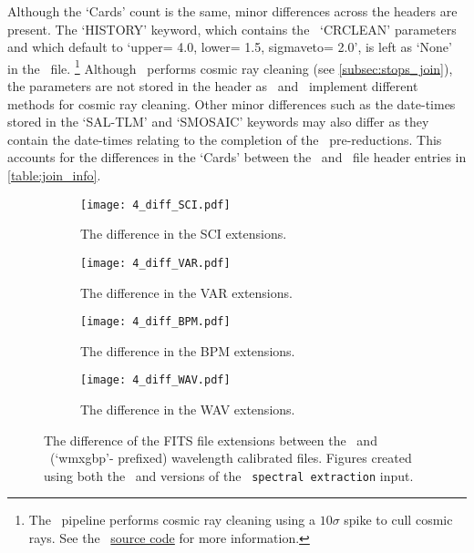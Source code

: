 Although the `Cards' count is the same, minor differences across the headers are present. The `HISTORY' keyword, which contains the \polsalt\ `CRCLEAN' parameters and which default to `upper= 4.0, lower= 1.5, sigmaveto= 2.0', is left as `None' in the \stops\ file.%
\footnote{The \polsalt\ pipeline performs cosmic ray cleaning using a $10\sigma$ spike to cull cosmic rays. See the \polsalt\ \protect\href{https://github.com/saltastro/polsalt/blob/master/polsalt/specpolwavmap.py\#L132}{source code} for more information.}
Although \stops\ performs cosmic ray cleaning (see \autoref{subsec:stops_join}), the parameters are not stored in the header as \polsalt\ and \stops\ implement different methods for cosmic ray cleaning. Other minor differences such as the date-times stored in the `SAL-TLM' and `SMOSAIC' keywords may also differ as they contain the date-times relating to the completion of the \polsalt\ pre-reductions. This accounts for the differences in the `Cards' between the \polsalt\ and \stops\ file header entries in \autoref{table:join_info}.

\begin{figure}
    \centering
    \begin{subfigure}[b]{\textwidth}
        \centering
        \texttt{[image: 4\_diff\_SCI.pdf]}
        \caption{The difference in the \gls{SCI} extensions.}
        \label{subfig:join_SCI}
    \end{subfigure}
    \hfill
    \begin{subfigure}[b]{\textwidth}
        \centering
        \texttt{[image: 4\_diff\_VAR.pdf]}
        \caption{The difference in the \gls{VAR} extensions.}
        \label{subfig:join_VAR}
    \end{subfigure}
    \hfill
    \begin{subfigure}[b]{\textwidth}
        \centering
        \texttt{[image: 4\_diff\_BPM.pdf]}
        \caption{The difference in the \gls{BPM} extensions.}
        \label{subfig:join_BPM}
    \end{subfigure}
    \hfill
    \begin{subfigure}[b]{\textwidth}
        \centering
        \texttt{[image: 4\_diff\_WAV.pdf]}
        \caption{The difference in the \gls{WAV} extensions.}
        \label{subfig:join_WAV}
    \end{subfigure}
    \caption{The difference of the \gls{FITS} file extensions between the \polsalt\ and \stops\ (`wmxgbp'- prefixed) wavelength calibrated files. Figures created using both the \polsalt\ and \stops versions of the \polsalt\ \texttt{spectral extraction} input.}
    \label{fig:join_in_out_diff}
\end{figure}

